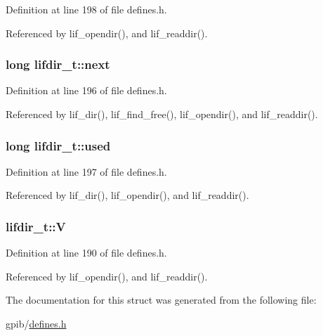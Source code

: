 Definition at line 198 of file defines.\+h.



Referenced by lif\+\_\+opendir(), and lif\+\_\+readdir().

\subsubsection[{\texorpdfstring{next}{next}}]{\setlength{\rightskip}{0pt plus 5cm}long lifdir\+\_\+t\+::next}\hypertarget{structlifdir__t_a52a7520a6393d4782afb0ccd42899215}{}\label{structlifdir__t_a52a7520a6393d4782afb0ccd42899215}


Definition at line 196 of file defines.\+h.



Referenced by lif\+\_\+dir(), lif\+\_\+find\+\_\+free(), lif\+\_\+opendir(), and lif\+\_\+readdir().

\subsubsection[{\texorpdfstring{used}{used}}]{\setlength{\rightskip}{0pt plus 5cm}long lifdir\+\_\+t\+::used}\hypertarget{structlifdir__t_a20f303d91cccc01286974be1ee064a8f}{}\label{structlifdir__t_a20f303d91cccc01286974be1ee064a8f}


Definition at line 197 of file defines.\+h.



Referenced by lif\+\_\+dir(), lif\+\_\+opendir(), and lif\+\_\+readdir().

\subsubsection[{\texorpdfstring{V}{V}}]{ lifdir\+\_\+t\+::V}\hypertarget{structlifdir__t_a5a888dc3f1844ff0c8203d5bb0aa48b4}{}\label{structlifdir__t_a5a888dc3f1844ff0c8203d5bb0aa48b4}


Definition at line 190 of file defines.\+h.



Referenced by lif\+\_\+opendir(), and lif\+\_\+readdir().



The documentation for this struct was generated from the following file\+:\begin{DoxyCompactItemize}
\item 
gpib/\hyperlink{defines_8h}{defines.\+h}\end{DoxyCompactItemize}
